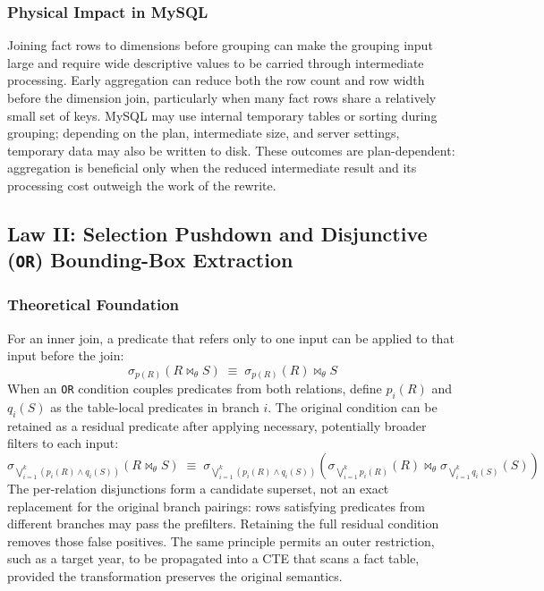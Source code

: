 \documentclass{ULBreport}
\begin{document}
\subsubsection{Physical Impact in MySQL}
Joining fact rows to dimensions before grouping can make the grouping input large and require wide descriptive values to be carried through intermediate processing. Early aggregation can reduce both the row count and row width before the dimension join, particularly when many fact rows share a relatively small set of keys. MySQL may use internal temporary tables or sorting during grouping; depending on the plan, intermediate size, and server settings, temporary data may also be written to disk. These outcomes are plan-dependent: aggregation is beneficial only when the reduced intermediate result and its processing cost outweigh the work of the rewrite.

\subsection{Law II: Selection Pushdown and Disjunctive (\texttt{OR}) Bounding-Box Extraction}

\subsubsection{Theoretical Foundation}
For an inner join, a predicate that refers only to one input can be applied to that input before the join:
\begin{equation}
\sigma_{p(R)}(R \bowtie_{\theta} S)
\;\equiv\;
\sigma_{p(R)}(R) \bowtie_{\theta} S
\end{equation}
When an \texttt{OR} condition couples predicates from both relations, define $p_i(R)$ and $q_i(S)$ as the table-local predicates in branch $i$. The original condition can be retained as a residual predicate after applying necessary, potentially broader filters to each input:
\begin{equation}
\sigma_{\bigvee_{i=1}^{k}(p_i(R)\land q_i(S))}
(R \bowtie_{\theta} S)
\;\equiv\;
\sigma_{\bigvee_{i=1}^{k}(p_i(R)\land q_i(S))}
\left(
\sigma_{\bigvee_{i=1}^{k}p_i(R)}(R)
\bowtie_{\theta}
\sigma_{\bigvee_{i=1}^{k}q_i(S)}(S)
\right)
\end{equation}
The per-relation disjunctions form a candidate superset, not an exact replacement for the original branch pairings: rows satisfying predicates from different branches may pass the prefilters. Retaining the full residual condition removes those false positives. The same principle permits an outer restriction, such as a target year, to be propagated into a CTE that scans a fact table, provided the transformation preserves the original semantics.
\end{document}
